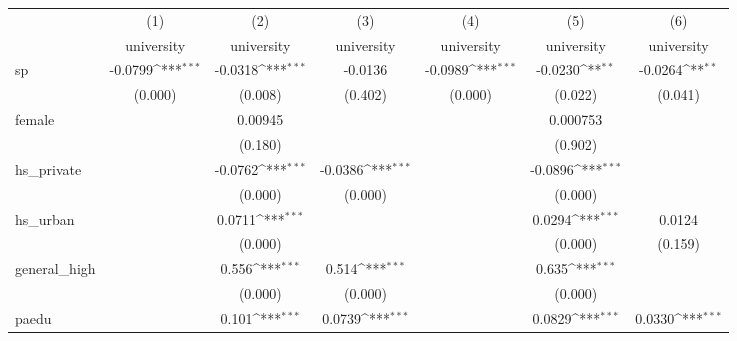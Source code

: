 \documentclass[11pt, letterpaper]{article}
\begin{document}
{
\def\sym#1{\ifmmode^{#1}\else\(^{#1}\)\fi}
\centering
\begin{tabular}{l*{6}{c}}
\hline\hline
            &\multicolumn{1}{c}{(1)}&\multicolumn{1}{c}{(2)}&\multicolumn{1}{c}{(3)}&\multicolumn{1}{c}{(4)}&\multicolumn{1}{c}{(5)}&\multicolumn{1}{c}{(6)}\\
            &\multicolumn{1}{c}{university}&\multicolumn{1}{c}{university}&\multicolumn{1}{c}{university}&\multicolumn{1}{c}{university}&\multicolumn{1}{c}{university}&\multicolumn{1}{c}{university}\\
\hline
sp          &     -0.0799\sym{***}&     -0.0318\sym{***}&     -0.0136         &     -0.0989\sym{***}&     -0.0230\sym{**} &     -0.0264\sym{**} \\
            &     (0.000)         &     (0.008)         &     (0.402)         &     (0.000)         &     (0.022)         &     (0.041)         \\
[1em]
female      &                     &     0.00945         &                     &                     &    0.000753         &                     \\
            &                     &     (0.180)         &                     &                     &     (0.902)         &                     \\
[1em]
hs\_private  &                     &     -0.0762\sym{***}&     -0.0386\sym{***}&                     &     -0.0896\sym{***}&                     \\
            &                     &     (0.000)         &     (0.000)         &                     &     (0.000)         &                     \\
[1em]
hs\_urban    &                     &      0.0711\sym{***}&                     &                     &      0.0294\sym{***}&      0.0124         \\
            &                     &     (0.000)         &                     &                     &     (0.000)         &     (0.159)         \\
[1em]
general\_high&                     &       0.556\sym{***}&       0.514\sym{***}&                     &       0.635\sym{***}&                     \\
            &                     &     (0.000)         &     (0.000)         &                     &     (0.000)         &                     \\
[1em]
paedu       &                     &       0.101\sym{***}&      0.0739\sym{***}&                     &      0.0829\sym{***}&      0.0330\sym{***}\\

\end{tabular}}
\end{document}
